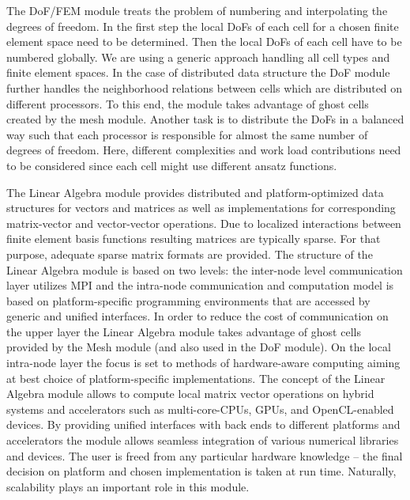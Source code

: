 The DoF/FEM module treats the problem of numbering and interpolating the degrees
of freedom. In the first step the local DoFs of each cell
for a chosen finite element space need to be determined. Then the local DoFs
of each cell have to be numbered globally. We are 
using a generic approach handling all cell types and finite element spaces.
In the case of distributed data structure the DoF module further handles the
neighborhood relations between cells which are distributed on different
processors. To this end, the module takes advantage of ghost cells created by
the mesh module. Another task is to distribute the DoFs in a balanced way such
that each processor is responsible for almost the same number of degrees of
freedom. Here, different complexities and work load contributions need to be
considered since each cell might use different ansatz functions.

The Linear Algebra module provides distributed and platform-optimized
data structures for vectors and matrices as well as implementations for corresponding
matrix-vector and vector-vector operations. Due to localized
interactions between finite element basis functions resulting matrices
are typically sparse. For that purpose, adequate sparse matrix formats
are provided. The structure of the Linear Algebra module is based on
two levels: the inter-node level communication layer utilizes MPI and
the intra-node communication and computation model is based on
platform-specific programming environments that are accessed by
generic and unified interfaces. In order to reduce the cost of
communication on the upper layer the Linear Algebra module takes
advantage of ghost cells provided by the Mesh module (and also used in
the DoF module). On the local intra-node layer the focus is set to
methods of hardware-aware computing aiming at best choice of
platform-specific implementations. The concept of the Linear Algebra
module allows to compute local matrix vector operations on hybrid
systems and accelerators such as multi-core-CPUs, GPUs, and
OpenCL-enabled devices. By providing unified interfaces with back ends
to different platforms and accelerators the module allows seamless
integration of various numerical libraries and devices. The user is
freed from any particular hardware knowledge -- the final decision on
platform and chosen implementation is taken at run time. Naturally,
scalability plays an important role in this module.

